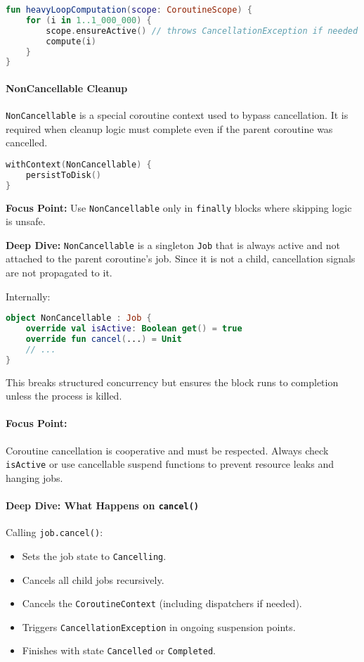 \documentclass[a4paper,12pt]{article}
\begin{document}
\begin{lstlisting}[language=Kotlin]
fun heavyLoopComputation(scope: CoroutineScope) {
    for (i in 1..1_000_000) {
        scope.ensureActive() // throws CancellationException if needed
        compute(i)
    }
}
\end{lstlisting}

\paragraph{NonCancellable Cleanup}

\texttt{NonCancellable} is a special coroutine context used to bypass cancellation. It is required when cleanup logic must complete even if the parent coroutine was cancelled.

\begin{lstlisting}[language=Kotlin]
withContext(NonCancellable) {
    persistToDisk()
}
\end{lstlisting}

\textbf{Focus Point:} Use \texttt{NonCancellable} only in \texttt{finally} blocks where skipping logic is unsafe.

\textbf{Deep Dive:}  
\texttt{NonCancellable} is a singleton \texttt{Job} that is always active and not attached to the parent coroutine's job. Since it is not a child, cancellation signals are not propagated to it.

Internally:
\begin{lstlisting}[language=Kotlin]
object NonCancellable : Job {
    override val isActive: Boolean get() = true
    override fun cancel(...) = Unit
    // ...
}
\end{lstlisting}

This breaks structured concurrency but ensures the block runs to completion unless the process is killed.


\paragraph{Focus Point:} Coroutine cancellation is cooperative and must be respected. Always check \texttt{isActive} or use cancellable suspend functions to prevent resource leaks and hanging jobs.

\paragraph{Deep Dive: What Happens on \texttt{cancel()}}

Calling \texttt{job.cancel()}:
\begin{itemize}
  \item Sets the job state to \texttt{Cancelling}.
  \item Cancels all child jobs recursively.
  \item Cancels the \texttt{CoroutineContext} (including dispatchers if needed).
  \item Triggers \texttt{CancellationException} in ongoing suspension points.
  \item Finishes with state \texttt{Cancelled} or \texttt{Completed}.
\end{itemize}
\end{document}
